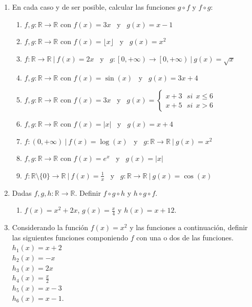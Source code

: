 \documentclass[a4paper]{article}
\newcommand{\exercise}{\item}
\begin{document}
\begin{enumerate}
\begin{enumerate} [label=(\alph*)]
	\end{enumerate}
	\exercise En cada caso y de ser posible, calcular las funciones $g \circ f$ y $f \circ g$:
	\begin{enumerate} [label=(\alph*)]
		\item $f,g:\mathbb{R} \to \mathbb{R}$ con $f(x)=3x$ ~y~ $g(x)=x-1$
		\item $f,g:\mathbb{R} \to \mathbb{R}$ con $f(x)=\lfloor x \rfloor$ ~y~ $g(x)=x^2$
		\item $f:\mathbb{R} \to \mathbb{R} ~|~ f(x)=2x$ ~y~ $g:\left[0,+\infty\right) \to \left[0,+\infty\right) ~|~ g(x)=\sqrt{x}$
		\item $f,g:\mathbb{R} \to \mathbb{R}$ con $f(x)=\sin(x)$ ~y~ $g(x)=3x+4$
		\item $f,g:\mathbb{R} \to \mathbb{R}$ con $f(x)=3x$ ~y~ $g(x)=\left\{\begin{matrix}x+3 ~~~ si ~~x\leq 6\\ x+5 ~~~ si ~~x>6\end{matrix}\right.$
		\item $f,g:\mathbb{R} \to \mathbb{R}$ con $f(x)=|x|$ ~y~ $g(x)=x+4$
		\item $f:\left(0,+\infty\right) ~|~ f(x)=\log(x)$ ~y~ $g:\mathbb{R} \to \mathbb{R} ~|~ g(x)=x^2$
		\item $f,g:\mathbb{R} \to \mathbb{R}$ con $f(x)=e^{x}$ ~y~ $g(x)=|x|$
		\item $f:\mathbb{R}\setminus\{0\} \to \mathbb{R} ~|~ f(x)=\displaystyle{\frac{1}{x}}$ ~y~ $g:\mathbb{R} \to \mathbb{R} ~|~ g(x)=\cos(x)$
	\end{enumerate}
	\exercise Dadas $f,g,h: \mathbb{R} \to \mathbb{R}$. Definir $f \circ g \circ h$ y $h \circ g \circ f$. 
	\begin{enumerate} [label=(\alph*)]
		\item $f(x)=x^2+2x$, $g(x)=\displaystyle\frac{x}{4}$ y $h(x)=x+12$.
	\end{enumerate}
	\exercise Considerando la función $f(x)=x^2$ y las funciones a continuación, definir las siguientes funciones componiendo $f$ con una o dos de las funciones. \\ $h_1(x)=x+2$ \\ $h_2(x)=-x$ \\ $h_3(x)=2x$ \\ $h_4(x)=\displaystyle\frac{x}{2}$ \\ $h_5(x)=x-3$ \\ $h_6(x)=x-1$.

\end{enumerate}
\end{document}
